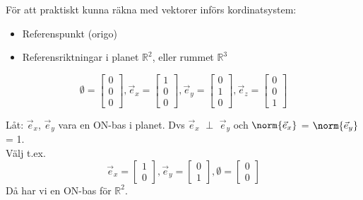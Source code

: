 För att praktiskt kunna räkna med vektorer införs kordinatsystem:
\begin{itemize}
  \item Referenspunkt (origo)
  \item Referensriktningar i planet $\mathbb{R}^2$, eller rummet $\mathbb{R}^3$
\end{itemize}

\begin{Ex}
\[
    \emptyset = \begin{bmatrix} 0 \\ 0 \\ 0 \end{bmatrix}, \vec{e}_x = \begin{bmatrix} 1 \\ 0 \\ 0 \end{bmatrix}, \vec{e}_y = \begin{bmatrix} 0 \\ 1 \\ 0 \end{bmatrix}, \vec{e}_z = \begin{bmatrix} 0 \\ 0 \\ 1 \end{bmatrix}
\]
\end{Ex}
\noindent
Låt: $\vec{e}_x$, $\vec{e}_y$ vara en ON-bas i planet. Dvs $\vec{e}_x$ $\perp$ $\vec{e}_y$ och  $\norm{\vec{e}_x }$ = $\norm{\vec{e}_y}$ = 1.
\\
\noindent
Välj t.ex.
\[
     \vec{e}_x = \begin{bmatrix} 1 \\ 0 \end{bmatrix}, \vec{e}_y = \begin{bmatrix} 0 \\ 1 \end{bmatrix}, \emptyset = \begin{bmatrix} 0 \\ 0 \end{bmatrix}
 \] Då har vi en ON-bas för $\mathbb{R}^2$.
 
